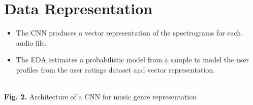 
\section{Data Representation}

\begin{itemize}
\item The CNN produces a vector representation of the spectrograms for each audio file.
\item The EDA \cite{Ding2015451} estimates a probabilistic model from a sample to model the user profiles from the user ratings dataset and vector representation. 
\end{itemize}

\begin{center}
	\\
	{\large \textbf{Fig. 2.} Architecture of a CNN for music genre representation}\\[2ex]
	\\

\end{center}

